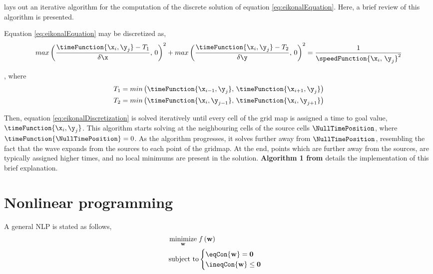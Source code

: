 \citet{fmAdvancedGomez} lays out an iterative algorithm for the computation of the discrete solution of equation \eqref{eq:eikonalEquation}. Here, a brief review of this algorithm is presented.

Equation \eqref{eq:eikonalEquation} may be discretized as,
\begin{equation}
	max\left( \frac{\timeFunction{\x_i, \y_j} - T_1}{\delta \x},\, 0 \right)^2 + max\left( \frac{\timeFunction{\x_i, \y_j} - T_2}{\delta \y},\, 0 \right)^2 = \frac{1}{\speedFunction{\x_i,\, \y_j}^2}
	\label{eq:eikonalDiscretization}
\end{equation}

\noindent , where
\begin{equation}
	\begin{aligned}
		T_1 &= min\left( \timeFunction{\x_{i-1}, \y_j},\, \timeFunction{\x_{i+1}, \y_j} \right)\\
		T_2 &= min\left( \timeFunction{\x_i, \y_{j-1}},\, \timeFunction{\x_i, \y_{j+1}} \right)
	\end{aligned}
	\label{eq:t1t2}
\end{equation}

Then, equation \eqref{eq:eikonalDiscretization} is solved iteratively until every cell of the grid map is assigned a time to goal value, $\timeFunction{\x_i, \y_j}$. This algorithm starts solving  at the neighbouring cells of the source cells $\NullTimePosition$, where $\timeFunction{\NullTimePosition} = 0$. As the algorithm progresses, it solves  further away from $\NullTimePosition$, resembling the fact that the wave expands from the sources to each point of the gridmap. At the end, points which are further away from the sources, are typically assigned higher times, and no local minimums are present in the solution. \textbf{Algorithm 1 from \cite{fmAdvancedGomez}} details the implementation of this brief explanation.

\section{Nonlinear programming}
\label{section:nonlinearopt}

A general NLP \cite{diehlnumericalocp} is stated as follows,
\begin{equation}
\begin{aligned}
	\underset{\mathbf{w}}{\text{minimize}} \hspace{1mm} &f\left(\mathbf{w}\right)\\
	\text{subject to} &
	\begin{cases}
		\eqCon{\mathbf{w}} = \mathbf{0}\\
		\ineqCon{\mathbf{w}} \leq \mathbf{0}
	\end{cases}
\end{aligned}
\label{eq:gennlp}
\end{equation}

